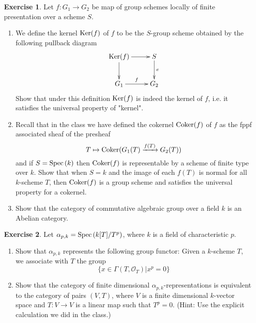 \documentclass[12pt]{amsart}
\theoremstyle{plain}
\theoremstyle{definition}
\newtheorem{ex}{Exercise}
\numberwithin{Aufgabe}{section}
\newcommand{\Coker}{{\rm Coker}}
\newcommand{\Ker}{{\rm Ker}}
\newcommand{\Spec}{{\rm Spec \,}}
\newcommand{\sO}{{\mathcal O}}
\begin{document}
\begin{ex} Let $f:G_1\to G_2$ be map of group schemes locally of finite presentation over a scheme $S$.
 \begin{enumerate} \item We define the kernel $\Ker(f)$ of $f$ to be the $S$-group scheme obtained by the following pullback diagram $$\xymatrix{\Ker(f)\ar[r]\ar[d]&S\ar[d]^-e\\ G_1\ar[r]^-f& G_2}$$ Show that under this definition $\Ker(f)$ is indeed the kernel of $f$, i.e. it satisfies the universal property of "kernel".
\item Recall that in the class we have defined the cokernel $\Coker(f)$ of $f$ as the fppf  associated sheaf of the presheaf $$T\mapsto \Coker(G_1(T)\xrightarrow{f(T)}G_2(T))$$ and if $S=\Spec(k)$ then $\Coker(f)$ is representable by a scheme of finite type over $k$.  Show that when $S=k$ and  the image of each $f(T)$ is normal for all $k$-scheme $T$, then  $\Coker(f)$ is a group scheme and satisfies the universal property for a cokernel.
\item Show that the category of commutative algebraic group over a field $k$ is an Abelian category.
\end{enumerate}
\end{ex}

\begin{ex} Let $\alpha_{p,k}=\Spec(k[T]/T^p)$, where $k$ is a field of characteristic $p$. 
\begin{enumerate}
\item Show that $\alpha_{p,k}$ represents the following group functor: Given a $k$-scheme $T$, we associate with $T$ the group $$\{x\in\Gamma(T,\sO_T)|x^p=0\}$$
\item Show that the category of finite dimensional $\alpha_{p,k}$-representations is equivalent to the category of pairs $(V, T)$, where $V$ is a finite dimensional $k$-vector space and $T: V\to V$ is a linear map such that $T^p=0$. (Hint: Use the explicit calculation we did in the class.)
\end{enumerate}
\end{ex}
\end{document}

